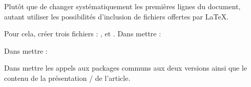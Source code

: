 Plutôt que de changer systématiquement les premières lignes du document, autant utiliser les possibilités d'inclusion de fichiers offertes par \LaTeX{}. 

Pour cela, créer trois fichiers :  ,  et .
Dans  mettre :


Dans  mettre :


Dans  mettre les appels aux packages communs aux deux versions ainsi que le contenu de la présentation / de l'article.



